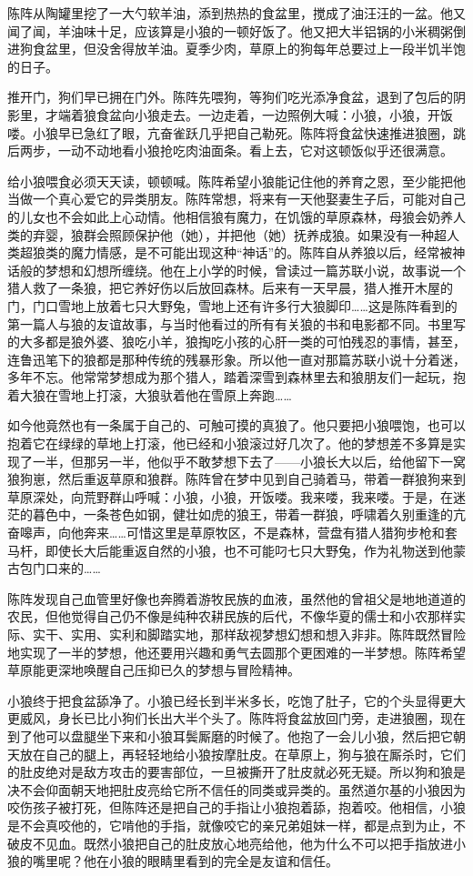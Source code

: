 \par 陈阵从陶罐里挖了一大勺软羊油，添到热热的食盆里，搅成了油汪汪的一盆。他又闻了闻，羊油味十足，应该算是小狼的一顿好饭了。他又把大半铝锅的小米稠粥倒进狗食盆里，但没舍得放羊油。夏季少肉，草原上的狗每年总要过上一段半饥半饱的日子。
\par 推开门，狗们早已拥在门外。陈阵先喂狗，等狗们吃光添净食盆，退到了包后的阴影里，才端着狼食盆向小狼走去。一边走着，一边照例大喊：小狼，小狼，开饭喽。小狼早已急红了眼，亢奋雀跃几乎把自己勒死。陈阵将食盆快速推进狼圈，跳后两步，一动不动地看小狼抢吃肉油面条。看上去，它对这顿饭似乎还很满意。
\par 给小狼喂食必须天天读，顿顿喊。陈阵希望小狼能记住他的养育之恩，至少能把他当做一个真心爱它的异类朋友。陈阵常想，将来有一天他娶妻生子后，可能对自己的儿女也不会如此上心动情。他相信狼有魔力，在饥饿的草原森林，母狼会奶养人类的弃婴，狼群会照顾保护他（她），并把他（她）抚养成狼。如果没有一种超人类超狼类的魔力情感，是不可能出现这种“神话”的。陈阵自从养狼以后，经常被神话般的梦想和幻想所缠绕。他在上小学的时候，曾读过一篇苏联小说，故事说一个猎人救了一条狼，把它养好伤以后放回森林。后来有一天早晨，猎人推开木屋的门，门口雪地上放着七只大野兔，雪地上还有许多行大狼脚印……这是陈阵看到的第一篇人与狼的友谊故事，与当时他看过的所有有关狼的书和电影都不同。书里写的大多都是狼外婆、狼吃小羊，狼掏吃小孩的心肝一类的可怕残忍的事情，甚至，连鲁迅笔下的狼都是那种传统的残暴形象。所以他一直对那篇苏联小说十分着迷，多年不忘。他常常梦想成为那个猎人，踏着深雪到森林里去和狼朋友们一起玩，抱着大狼在雪地上打滚，大狼驮着他在雪原上奔跑……
\par 如今他竟然也有一条属于自己的、可触可摸的真狼了。他只要把小狼喂饱，也可以抱着它在绿绿的草地上打滚，他已经和小狼滚过好几次了。他的梦想差不多算是实现了一半，但那另一半，他似乎不敢梦想下去了——小狼长大以后，给他留下一窝狼狗崽，然后重返草原和狼群。陈阵曾在梦中见到自己骑着马，带着一群狼狗来到草原深处，向荒野群山呼喊：小狼，小狼，开饭喽。我来喽，我来喽。于是，在迷茫的暮色中，一条苍色如钢，健壮如虎的狼王，带着一群狼，呼啸着久别重逢的亢奋嗥声，向他奔来……可惜这里是草原牧区，不是森林，营盘有猎人猎狗步枪和套马杆，即使长大后能重返自然的小狼，也不可能叼七只大野兔，作为礼物送到他蒙古包门口来的……
\par 陈阵发现自己血管里好像也奔腾着游牧民族的血液，虽然他的曾祖父是地地道道的农民，但他觉得自己仍不像是纯种农耕民族的后代，不像华夏的儒士和小农那样实际、实干、实用、实利和脚踏实地，那样敌视梦想幻想和想入非非。陈阵既然冒险地实现了一半的梦想，他还要用兴趣和勇气去圆那个更困难的一半梦想。陈阵希望草原能更深地唤醒自己压抑已久的梦想与冒险精神。
\par 小狼终于把食盆舔净了。小狼已经长到半米多长，吃饱了肚子，它的个头显得更大更威风，身长已比小狗们长出大半个头了。陈阵将食盆放回门旁，走进狼圈，现在到了他可以盘腿坐下来和小狼耳鬓厮磨的时候了。他抱了一会儿小狼，然后把它朝天放在自己的腿上，再轻轻地给小狼按摩肚皮。在草原上，狗与狼在厮杀时，它们的肚皮绝对是敌方攻击的要害部位，一旦被撕开了肚皮就必死无疑。所以狗和狼是决不会仰面朝天地把肚皮亮给它所不信任的同类或异类的。虽然道尔基的小狼因为咬伤孩子被打死，但陈阵还是把自己的手指让小狼抱着舔，抱着咬。他相信，小狼是不会真咬他的，它啃他的手指，就像咬它的亲兄弟姐妹一样，都是点到为止，不破皮不见血。既然小狼把自己的肚皮放心地亮给他，他为什么不可以把手指放进小狼的嘴里呢？他在小狼的眼睛里看到的完全是友谊和信任。
